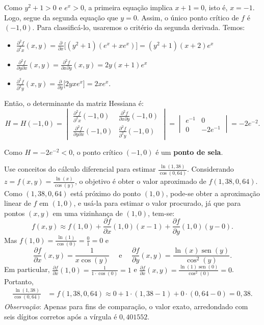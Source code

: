 \documentclass[12pt,a4paper]{article}
\newcommand*\sen{\operatorname{sen}}
\begin{document}
\begin{ExerciseList}
Como $y^2 + 1 > 0$ e $e^x > 0$, a primeira equação implica $x + 1 = 0$, isto é, $x = -1$. Logo, segue da segunda equação que $y = 0$. Assim, o único ponto crítico de $f$ é $(-1, 0)$. Para classificá-lo, usaremos o critério da segunda derivada. Temos:

\begin{itemize}
\item \(\frac{\partial^2 f}{\partial^2 x}(x, y)
= \frac{\partial}{\partial x} \big[(y^2 + 1)(e^x + x e^x)\big]
= (y^2 + 1)(x + 2)e^x\)
\item \(\frac{\partial^2 f}{\partial y\partial x}(x, y)
= \frac{\partial^2 f}{\partial x\partial y}(x, y)
= 2y(x + 1)e^x
\)
\item \(
\frac{\partial^2 f}{\partial^2 y}(x, y)
= \frac{\partial}{\partial y} \big[2y x e^x\big]
= 2x e^x.
\)
\end{itemize}
Então, o determinante da matriz Hessiana é:
\[
H
= H(-1, 0)
= \begin{vmatrix}
    \frac{\partial^2 f}{\partial^2 x}(-1, 0) & \frac{\partial^2 f}{\partial x\partial y}(-1, 0) \\
    \frac{\partial^2 f}{\partial y\partial x}(-1, 0) & \frac{\partial^2 f}{\partial^2 y}(-1, 0)
\end{vmatrix}
= \begin{vmatrix}
    e^{-1} & 0 \\
    0 & -2 e^{-1}
\end{vmatrix}
= -2e^{-2}.
\]

Como $H = -2e^{-2} < 0$, o ponto crítico $(-1, 0)$ é um \textbf{ponto de sela}.

\Exercise[title={2,5}] Use conceitos do cálculo diferencial para estimar $\frac{\ln(1,38)}{\cos(0,64)}$.
\Answer Considerando $z = f(x, y) = \frac{\ln(x)}{\cos(y)}$, o objetivo é obter o valor aproximado de $f(1,38, 0,64)$. Como $(1,38, 0,64)$ está próximo do ponto $(1, 0)$, pode-se obter a aproximação linear de $f$ em $(1, 0)$, e usá-la para estimar o valor procurado, já que para pontos $(x, y)$ em uma vizinhança de $(1, 0)$, tem-se:
\[
  f(x, y) \approx f(1, 0) + \frac{\partial f}{\partial x}(1, 0)(x - 1) + \frac{\partial f}{\partial y}(1, 0)(y - 0).
\]
Mas $f(1, 0) = \frac{\ln(1)}{\cos(0)} = \frac{0}{1} = 0$ e
\[
  \frac{\partial f}{\partial x}(x, y)
  = \frac{1}{x\cos(y)}
  \quad\text{ e }\quad
  \frac{\partial f}{\partial y}(x, y)
  = \frac{\ln(x)\sen(y)}{\cos^2(y)}.
\]
Em particular, $\frac{\partial f}{\partial x}(1, 0) = \frac{1}{1\cdot \cos(0)} = 1$ e $\frac{\partial f}{\partial x}(x, y) =\frac{\ln(1)\sen(0)}{\cos^2(0)} = 0$. Portanto,
\begin{align*}
  \frac{\ln(1,38)}{\cos(0,64)}
  & = f(1,38, 0,64)
    \approx 0 + 1 \cdot (1,38 - 1) + 0\cdot (0,64 - 0)
    = 0,38.
\end{align*}
\textit{Observação}: Apenas para fins de comparação, o valor exato, arredondado com seis dígitos corretos após a vírgula é $0,401552$.


\end{ExerciseList}
\end{document}
